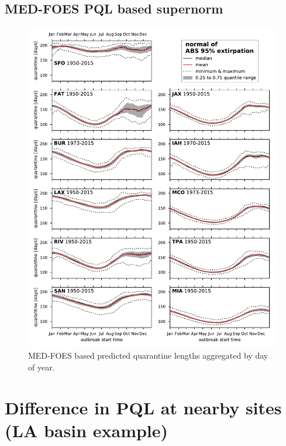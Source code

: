 \documentclass[10pt,a4paper]{article}
\begin{document}
\subsection{MED-FOES PQL based supernorm}
\begin{figure}[hb!]
\centering
\includegraphics{figs/fig_all_pe95_supernorm.pdf}
\caption{\label{fig:medfoesPQL_supernorm}
MED-FOES based predicted quarantine lengths aggregated by day of year.
}
\end{figure}
\clearpage


\section{Difference in PQL at nearby sites (LA basin example)}
\end{document}
